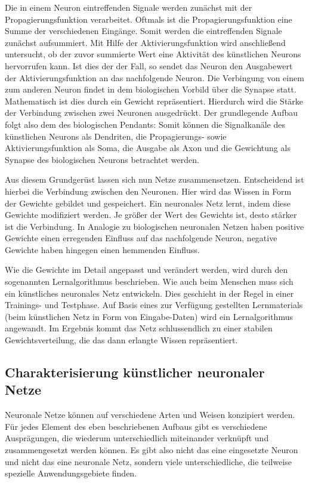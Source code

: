 Die in einem Neuron eintreffenden Signale werden zunächst mit der Propagierungsfunktion verarbeitet. Oftmals ist die Propagierungsfunktion eine Summe der verschiedenen Eingänge. Somit werden die eintreffenden Signale zunächst aufsummiert. Mit Hilfe der Aktivierungsfunktion wird anschließend untersucht, ob der zuvor summierte Wert eine Aktivität des künstlichen Neurons hervorrufen kann. Ist dies der der Fall, so sendet das Neuron den Ausgabewert der Aktivierungsfunktion an das nachfolgende Neuron. Die Verbingung von einem zum anderen Neuron findet in dem biologischen Vorbild über die Synapse statt. Mathematisch ist dies durch ein Gewicht repräsentiert. Hierdurch wird die Stärke der Verbindung zwischen zwei Neuronen ausgedrückt. Der grundlegende Aufbau folgt also dem des biologischen Pendants: Somit können die Signalkanäle des künstlichen Neurons als Dendriten, die Propagierungs- sowie Aktivierungsfunktion als Soma, die Ausgabe als Axon und die Gewichtung als Synapse des biologischen Neurons betrachtet werden.

Aus diesem Grundgerüst lassen sich nun Netze zusammensetzen. Entscheidend ist hierbei die Verbindung zwischen den Neuronen. Hier wird das Wissen in Form der Gewichte gebildet und gespeichert. Ein neuronales Netz lernt, indem diese Gewichte modifiziert werden. Je größer der Wert des Gewichts ist, desto stärker ist die Verbindung. In Analogie zu biologischen neuronalen Netzen haben positive Gewichte einen erregenden Einfluss auf das nachfolgende Neuron, negative Gewichte haben hingegen einen hemmenden Einfluss.

Wie die Gewichte im Detail angepasst und verändert werden, wird durch den sogenannten Lernalgorithmus beschrieben. Wie auch beim Menschen muss sich ein künstliches neuronales Netz entwickeln. Dies geschieht in der Regel in einer Trainings- und Testphase. Auf Basis eines zur Verfügung gestellten Lernmaterials (beim künstlichen Netz in Form von Eingabe-Daten) wird ein Lernalgorithmus angewandt. Im Ergebnis kommt das Netz schlussendlich zu einer stabilen Gewichtsverteilung, die das dann erlangte Wissen repräsentiert.



\subsection{Charakterisierung künstlicher neuronaler Netze}\label{sec:char}

Neuronale Netze können auf verschiedene Arten und Weisen konzipiert werden. Für jedes Element des eben beschriebenen Aufbaus gibt es verschiedene Ausprägungen, die wiederum unterschiedlich miteinander verknüpft und zusammengesetzt werden können. Es gibt also nicht das eine eingesetzte Neuron und nicht das eine neuronale Netz, sondern viele unterschiedliche, die teilweise spezielle Anwendungsgebiete finden.

